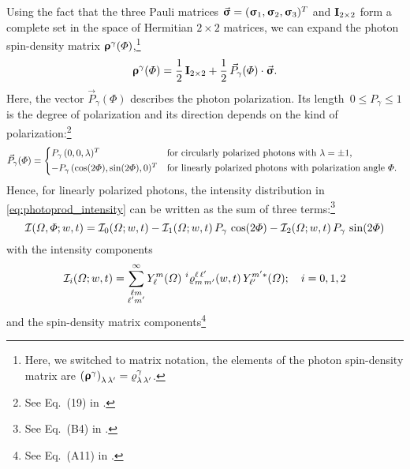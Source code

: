 Using the fact that the three Pauli matrices $\vec{\bm{\mathrm{\upsigma}}} =
(\bm{\mathrm{\upsigma}}_1, \bm{\mathrm{\upsigma}}_2, \bm{\mathrm{\upsigma}}_3)^T$ and
$\bm{\mathrm{I}}_{2 \times 2}$ form a complete set in the space of Hermitian
$2 \times 2$ matrices, we can expand the photon spin-density matrix
$\bm{\mathrm{\upvarrho}}^\gamma(\Phi)$,\footnote{Here, we switched to matrix
notation, \ie the elements of the photon spin-density matrix are
$\rBrk{\mat{\upvarrho}^\gamma}_{\lambda\, \lambda'} =
\varrho^\gamma_{\lambda\, \lambda'}$.}
\ie
\begin{equation}
  \bm{\mathrm{\upvarrho}}^\gamma(\Phi)
  = \frac{1}{2}\, \bm{\mathrm{I}}_{2 \times 2} + \frac{1}{2}\, \vec{P}_\gamma(\Phi) \cdot \vec{\bm{\mathrm{\upsigma}}}.
\end{equation}
Here, the vector $\vec{P}_\gamma(\Phi)$ describes the photon
polarization.  Its length~$0 \leq P_\gamma \leq 1$ is the degree of
polarization and its direction depends on the kind of
polarization:\footnote{See Eq.~(19) in .}
\begin{equation}
  \vec{P}_\gamma(\Phi)
  = \begin{cases*}
    P_\gamma\, (0, 0, \lambda)^T                & for circularly polarized photons with $\lambda = \pm 1$, \\
    -P_\gamma\, (\cos(2 \Phi), \sin(2 \Phi), 0)^T & for linearly polarized photons with polarization angle~$\Phi$.
  \end{cases*}
\end{equation}
Hence, for linearly polarized photons, the intensity distribution in
\cref{eq:photoprod_intensity} can be written as the sum of three
terms:\footnote{See Eq.~(B4) in .}
\begin{equation}
  \label{eq:photoprod_intensity_sum}
  \mathcal{I}(\Omega, \Phi; w, t)
  = \mathcal{I}_0(\Omega; w, t)
  - \mathcal{I}_1(\Omega; w, t)\, P_\gamma\, \cos(2 \Phi)
  - \mathcal{I}_2(\Omega; w, t)\, P_\gamma\, \sin(2 \Phi)
\end{equation}
with the intensity components
\begin{equation}
  \label{eq:photoprod_intensity_components}
  \mathcal{I}_i(\Omega; w, t)
  = \sum_{\substack{\ell m \\ \ell' m'}}^\infty
  Y_\ell^m(\Omega)\,
  \prescript{i}{}{\varrho}^{\ell\, \ell'}_{m\, m'}(w, t)\,
  Y_{\ell'}^{m' *}(\Omega);
  \quad i = 0, 1, 2
\end{equation}
and the spin-density matrix components\footnote{See Eq.~(A11) in
.}
